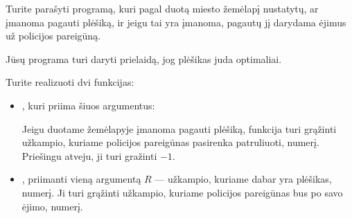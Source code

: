 \documentclass{boi2014-lt}
\begin{document}
    \Task
	Turite parašyti programą, kuri pagal duotą miesto žemėlapį nustatytų,
	ar įmanoma pagauti plėšiką, ir jeigu tai yra įmanoma, pagautų jį
	darydama ėjimus už policijos pareigūną.

	Jūsų programa turi daryti prielaidą, jog plėšikas juda optimaliai.
	
	\pagebreak

    \Implementation
    Turite realizuoti dvi funkcijas:
    \begin{itemize}
        \item {}, kuri priima šiuos argumentus:

		Jeigu duotame žemėlapyje įmanoma pagauti plėšiką, funkcija 
		turi grąžinti užkampio, kuriame policijos pareigūnas pasirenka
		patruliuoti, numerį. Priešingu atveju, ji turi gražinti $-1$.

		\item {}, priimanti vieną argumentą $R$ --- užkampio,
			kuriame dabar yra plėšikas, numerį. Ji turi grąžinti užkampio,
			kuriame policijos pareigūnas bus po savo ėjimo, numerį.
    \end{itemize}
\end{document}
